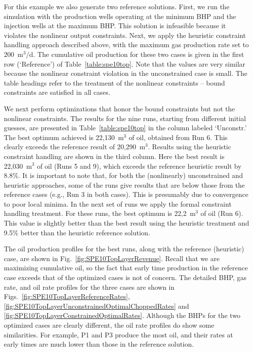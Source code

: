 \documentclass[twocolumn,numbook]{svjour3}          %
\begin{document}
For this example we also generate two reference solutions. First, we run the
simulation with the production wells operating at the minimum BHP and the
injection wells at the maximum BHP. This solution is infeasible because it
violates the nonlinear output constraints. Next, we apply the heuristic
constraint handling approach described above, with the maximum gas production
rate set to 200~m$^3/$d. The cumulative oil production for these two cases is
given in the first row (`Reference') of Table~\ref{table:spe10top}. Note that
the values are very similar because the nonlinear constraint violation in the
unconstrained case is small. The table headings refer to the treatment of the
nonlinear constraints -- bound constraints are satisfied in all cases.


We next perform optimizations that honor the bound constraints but not the
nonlinear constraints. The results for the nine runs, starting from different
initial guesses, are presented in Table~\ref{table:spe10top} in the column
labeled `Unconstr.' The best optimum achieved is 22,130~m$^3$ of oil, obtained
from Run 6.  This clearly exceeds the reference result
of 20,290~m$^3$. Results using the heuristic constraint handling are shown in
the third column. Here the best result is 22,030~m$^3$ of oil (Runs 5 and 9), which
exceeds the reference heuristic result by 8.8\%. It is important to note that, for both
the (nonlinearly) unconstrained and heuristic approaches, some of the runs
give results that are below those from the reference cases (e.g., Run 3 in both cases). 
This is presumably due to convergence to poor local minima. In
the next set of runs we apply the formal constraint handling treatment. For
these runs, the best optimum is 22,2~m$^3$ of oil (Run 6). This value is
slightly better than the best result using the heuristic treatment and 9.5\%
better than the heuristic reference solution. 

The oil production profiles for the best runs, along with the reference
(heuristic) case, are shown in Fig.~\ref{fig:SPE10TopLayerRevenue}. Recall that
we are maximizing cumulative oil, so the fact that early time production in the
reference case exceeds that of the optimized cases is not of concern. The
detailed BHP, gas rate, and oil rate profiles for the three cases are shown in
Figs.~\ref{fig:SPE10TopLayerReferenceRates},
\ref{fig:SPE10TopLayerUnconstrainedOptimalChoppedRates} and
\ref{fig:SPE10TopLayerConstrainedOptimalRates}. Although the BHPs for the two
optimized cases are clearly different, the oil rate profiles do show some
similarities. For example, P1 and P3 produce the most oil, and their rates at
early times are much lower than those in the reference solution.
\end{document}
